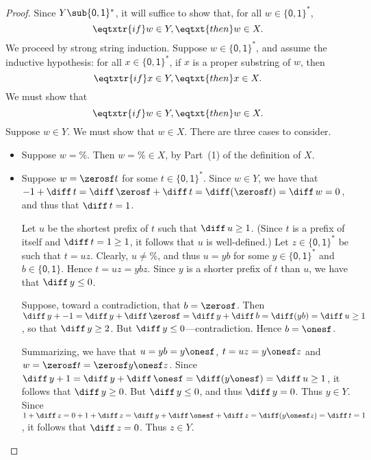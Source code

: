 \begin{proof}
Since $Y\sub\{\mathsf{0,1}\}^*$, it will suffice to show that, for all
$w\in\{\mathsf{0,1}\}^*$,
\begin{displaymath}
\eqtxtr{if}w\in Y,\eqtxt{then}w\in X .
\end{displaymath}
We proceed by strong string induction.
%
Suppose
$w\in\{\mathsf{0,1}\}^*$, and assume the inductive hypothesis: for all
$x\in \{\mathsf{0,1}\}^*$, if $x$ is a proper substring of $w$, then
\begin{displaymath}
\eqtxtr{if}x\in Y,\eqtxt{then}x\in X .
\end{displaymath}
We must show that
\begin{displaymath}
\eqtxtr{if}w\in Y,\eqtxt{then}w\in X .
\end{displaymath}
Suppose $w\in Y$.  We must show that $w\in X$.  There are three cases
to consider.
\begin{itemize}
\item Suppose $w=\%$.  Then $w=\%\in X$, by Part~(1) of the definition of $X$.

\item Suppose $w=\zerosf t$ for some $t\in\{\mathsf{0,1}\}^*$. Since
  $w\in Y$, we have that
  $-1+\diff\,t=\diff\,\zerosf+\diff\,t=\diff(\zerosf t)=\diff\,w=0$,
  and thus that $\diff\,t=1$.

  Let $u$ be the shortest prefix of $t$ such that $\diff\,u\geq 1$.
  (Since $t$ is a prefix of itself and $\diff\,t=1\geq 1$, it follows
  that $u$ is well-defined.)  Let $z\in\{\mathsf{0,1}\}^*$ be such
  that $t=uz$.  Clearly, $u\neq\%$, and thus $u=yb$ for some
  $y\in\{\mathsf{0,1}\}^*$ and $b\in\{\mathsf{0,1}\}$.  Hence
  $t=uz=ybz$.  Since $y$ is a shorter prefix of $t$ than $u$, we have
  that $\diff\,y\leq 0$.

  Suppose, toward a contradiction, that $b=\zerosf$.  Then
  $\diff\,y+-1=\diff\,y+\diff\,\zerosf=\diff\,y+\diff\,b=\diff(yb)=\diff\,u\geq
  1$, so that $\diff\,y\geq 2$.  But $\diff\,y\leq 0$---contradiction.
  Hence $b=\onesf$.

  Summarizing, we have that $u=yb=y\onesf$, $t=uz=y\onesf z$ and
  $w=\zerosf t=\zerosf y\onesf z$.  Since
  $\diff\,y+1=\diff\,y+\diff\,\onesf=\diff(y\onesf)=\diff\,u\geq 1$,
  it follows that $\diff\,y\geq 0$.  But $\diff\,y\leq 0$, and thus
  $\diff\,y=0$.  Thus $y\in Y$.  Since
  $1+\diff\,z=0+1+\diff\,z=\diff\,y+\diff\,\onesf+\diff\,z=\diff(y\onesf
  z)=\diff\,t=1$, it follows that $\diff\,z = 0$.  Thus $z\in Y$.


\end{itemize}
\end{proof}

